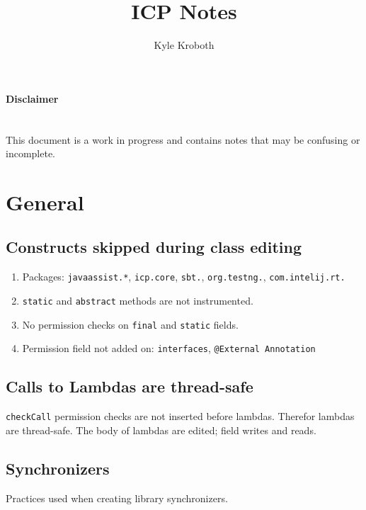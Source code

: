 \documentclass[9pt, twoside, a4paper]{article}
\begin{document}
    \title{ICP Notes}
    \author{Kyle Kroboth}
    \maketitle

    \paragraph*{Disclaimer}~\\
    This document is a work in progress and contains notes that may be confusing or incomplete.

    \setcounter{tocdepth}{4}
    \setcounter{secnumdepth}{4}
    \tableofcontents

    \section{General}

    \subsection{Constructs skipped during class editing}
    \begin{enumerate}
        \item Packages: \verb|javaassist.*|, \verb|icp.core|, \verb|sbt.|, \verb|org.testng.|,
        \verb|com.intelij.rt.|

        \item \verb|static| and \verb|abstract| methods are not instrumented.

        \item No permission checks on \verb|final| and \verb|static| fields.

        \item Permission field not added on: \verb|interfaces|, \verb|@External Annotation|
    \end{enumerate}


    \subsection{Calls to Lambdas are thread-safe}
    \lstinline{checkCall} permission checks are not inserted before lambdas. Therefor lambdas
    are thread-safe. The body of lambdas are edited; field writes and reads.

    \subsection{Synchronizers}
    Practices used when creating library synchronizers.
\end{document}
